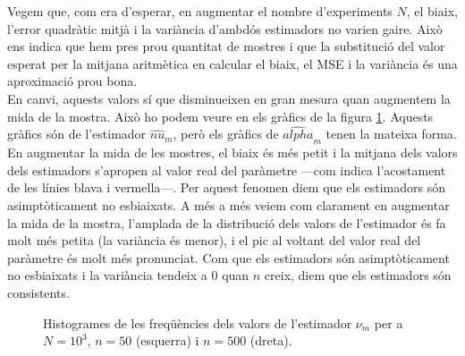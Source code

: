 \documentclass[12pt, catalan]{article}
\numberwithin{table}{section}
\numberwithin{figure}{section}
\numberwithin{equation}{section}
\begin{document}
Vegem que, com era d'esperar, en augmentar el nombre d'experiments $N$, el biaix, l'error quadràtic mitjà i la variància d'ambdós estimadors no varien gaire. Això ens indica que hem pres prou quantitat de mostres i que la substitució del valor esperat per la mitjana aritmètica en calcular el biaix, el MSE i la variància és una aproximació prou bona. 
\\
En canvi, aquests valors sí que disminueixen en gran mesura quan augmentem la mida de la mostra. Això ho podem veure en els gràfics de la figura \ref{comparar}. Aquests gràfics són de l'estimador $\hat{nu}_m$, però els gràfics de $\hat{alpha}_m$ tenen la mateixa forma. En augmentar la mida de les mostres, el biaix és més petit i la mitjana dels valors dels estimadors s'apropen al valor real del paràmetre ---com indica l'acostament de les línies blava i vermella---. Per aquest fenomen diem que els estimadors són asimptòticament no esbiaixats. A més a més veiem com clarament en augmentar la mida de la mostra, l'amplada de la distribució dels valors de l'estimador és fa molt més petita (la variància és menor), i el pic al voltant del valor real del paràmetre és molt més pronunciat. Com que els estimadors són asimptòticament no esbiaixats i la variància tendeix a 0 quan $n$ creix, diem que els estimadors són consistents.
\begin{figure}[!ht]
     \hfill
     \caption{Histogrames de les freqüències dels valors de l'estimador $\nu_m$ per a $N=10^3$, $n=50$ (esquerra) i $n=500$ (dreta).}
     \label{comparar}
  \end{figure}
\end{document}
